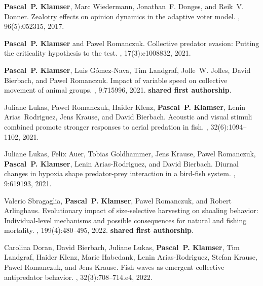 \documentclass[10pt,twocolumn]{article}
\begin{document}
\begin{thebibliography}{10}

\textbf{Pascal~P. Klamser}, Marc Wiedermann, Jonathan~F. Donges, and Reik~V. Donner.
\newblock Zealotry effects on opinion dynamics in the adaptive voter model.
, 96(5):052315, 2017.

\textbf{Pascal~P. Klamser} and Pawel Romanczuk.
\newblock Collective predator evasion: Putting the criticality hypothesis to the test.
, 17(3):e1008832, 2021.

\textbf{Pascal~P. Klamser}, Luis Gómez-Nava, Tim Landgraf, Jolle~W. Jolles, David Bierbach, and Pawel Romanczuk.
\newblock Impact of variable speed on collective movement of animal groups.
, 9:715996, 2021.
\newblock \textbf{shared first authorship}.

Juliane Lukas, Pawel Romanczuk, Haider Klenz, \textbf{Pascal~P. Klamser}, Lenin Arias~Rodriguez, Jens Krause, and David Bierbach.
\newblock Acoustic and visual stimuli combined promote stronger responses to aerial predation in fish.
, 32(6):1094--1102, 2021.

Juliane Lukas, Felix Auer, Tobias Goldhammer, Jens Krause, Pawel Romanczuk, \textbf{Pascal~P. Klamser}, Lenin Arias-Rodriguez, and David Bierbach.
\newblock Diurnal changes in hypoxia shape predator-prey interaction in a bird-fish system.
, 9:619193, 2021.

Valerio Sbragaglia, \textbf{Pascal~P. Klamser}, Pawel Romanczuk, and Robert Arlinghaus.
\newblock Evolutionary impact of size-selective harvesting on shoaling behavior: Individual-level mechanisms and possible consequences for natural and fishing mortality.
, 199(4):480--495, 2022.
\newblock \textbf{shared first authorship}.

Carolina Doran, David Bierbach, Juliane Lukas, \textbf{Pascal~P. Klamser}, Tim Landgraf, Haider Klenz, Marie Habedank, Lenin Arias-Rodriguez, Stefan Krause, Pawel Romanczuk, and Jens Krause.
\newblock Fish waves as emergent collective antipredator behavior.
, 32(3):708--714.e4, 2022.


\end{thebibliography}
\end{document}
